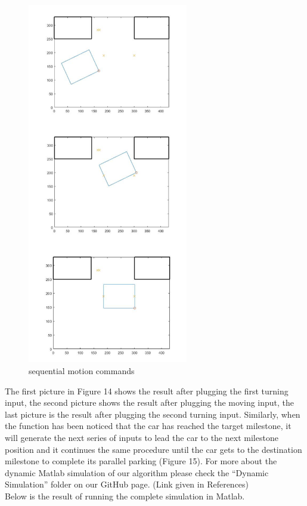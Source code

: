 \documentclass[12pt, letterpaper]{amsart} %
\numberwithin{equation}{section}
\begin{document}
\begin{figure}[h!]
\includegraphics[width=70mm]{fig_14.png}
\caption{sequential motion commands}
\label{fig:figure14}	
\end{figure}

The first picture in Figure 14 shows the result after 
plugging the first turning input, the second picture 
shows the result after plugging the moving input, the 
last picture is the result after plugging the second 
turning input.
Similarly, when the function has been noticed that the 
car has reached the target milestone, it will generate 
the next series of inputs to lead the car to the next 
milestone position and it continues the same procedure   until the car gets to the destination milestone to complete its parallel parking (Figure 15).
\newpage
For more about the dynamic Matlab simulation of our algorithm please check the “Dynamic Simulation” folder on our GitHub page.
(Link given in References) 
\\ Below is the result of running the complete simulation in Matlab.  
\end{document}
